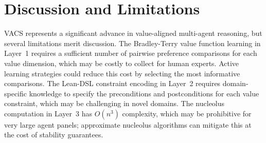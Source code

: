 \documentclass[12pt,a4paper]{article}
\begin{document}


\section{Discussion and Limitations}
\label{sec:discussion}

VACS represents a significant advance in value-aligned multi-agent reasoning, but
several limitations merit discussion. The Bradley-Terry value function learning in
Layer~1 requires a sufficient number of pairwise preference comparisons for each value
dimension, which may be costly to collect for human experts. Active learning strategies
could reduce this cost by selecting the most informative comparisons. The Lean-DSL
constraint encoding in Layer~2 requires domain-specific knowledge to specify the
preconditions and postconditions for each value constraint, which may be challenging
in novel domains. The nucleolus computation in Layer~3 has $O(n^3)$ complexity, which
may be prohibitive for very large agent panels; approximate nucleolus algorithms can
mitigate this at the cost of stability guarantees.
\end{document}
